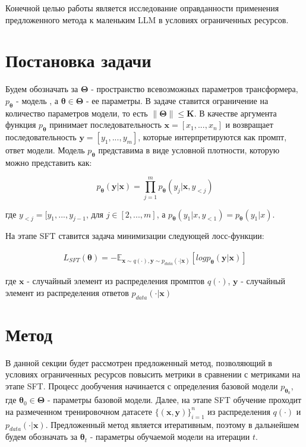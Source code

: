\documentclass[12pt, twoside]{article}
\newcommand{\bx}{\mathbf{x}}
\newcommand{\by}{\mathbf{y}}
\newcommand{\btheta}{\boldsymbol{\theta}}
\newcommand{\bTheta}{\boldsymbol{\Theta}}
\newcommand{\EE}{\mathbb{E}}
\begin{document}
Конечной целью работы является исследование оправданности применения предложенного метода к маленьким LLM в условиях ограниченных ресурсов.

\vspace{10}

\section{Постановка задачи}

Будем обозначать за $\bTheta$ - пространство всевозможных параметров трансформера, $p_{\btheta}$ - модель , а $\btheta \in \bTheta$ -  ее параметры. В задаче ставится ограничение на количество параметров модели, то есть $\|\bTheta\| \le \mathbf{K}$. В качестве аргумента функция $p_{\btheta}$ принимает последовательность $\bx = [x_1, ..., x_n]$ и возвращает последовательность $\by=[y_1, ..., y_m]$, которые интерпретируются как промпт, ответ модели. Модель $p_{\btheta}$ представима в виде условной плотности, которую можно представить как:

$$p_{\btheta}(\by|\bx) = \prod_{j=1}^m p_{\btheta}(y_j|\bx, y_{<j})$$

где $y_{<j} = [y_1, ..., y_{j-1}$, для $j \in [2, ..., m]$, а $p_{\btheta}(y_1|x, y_{<1}) = p_{\btheta}(y_1|x)$.

На этапе SFT ставится задача минимизации следующей лосс-функции:

\begin{align}
    L_{SFT}(\btheta) = -\EE_{\bx \sim q(\cdot), \by \sim p_{data}(\cdot|\bx)}[log p_{\btheta}(\by|\bx)]
\end{align}

где $\bx$ - случайный элемент из распределения промптов $q(\cdot)$, $\by$ - случайный элемент из распределения ответов $p_{data}(\cdot |\bx)$

\vspace{10}

\section{Метод}


В данной секции будет рассмотрен предложенный метод, позволяющий в условиях ограниченных ресурсов повысить метрики в сравнении с метриками на этапе SFT. Процесс дообучения начинается с определения базовой модели $p_{\btheta_0}$, где $\btheta_0 \in \bTheta$ - параметры базовой модели. Далее, на этапе SFT обучение проходит на размеченном тренировочном датасете $\{(\bx, \by)\}_{i=1}^n$ из распределения $q(\cdot)$ и $p_{data}(\cdot | \bx)$. Предложенный метод является итеративным, поэтому в дальнейшем будем обозначать за $\btheta_t$ - параметры обучаемой модели на итерации $t$.
\end{document}
